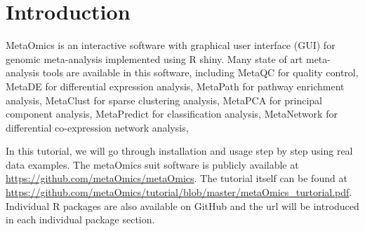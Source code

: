 \section{Introduction}
 
MetaOmics is an interactive software with graphical user interface (GUI) for genomic meta-analysis implemented using R shiny.
Many state of art meta-analysis tools are available in this software,
including MetaQC for quality control, 
MetaDE for differential expression analysis,
MetaPath for pathway enrichment analysis,
MetaClust for sparse clustering analysis,
MetaPCA for principal component analysis,
MetaPredict for classification analysis,
MetaNetwork for differential co-expression network analysis,

In this tutorial, 
we will go through installation and usage step by step using real data examples.
The metaOmics suit software is publicly available at \url{https://github.com/metaOmics/metaOmics}.
The tutorial itself can be found at \url{https://github.com/metaOmics/tutorial/blob/master/metaOmics_turtorial.pdf}.
Individual R packages are also available on GitHub and the url will be introduced in each individual package section.


